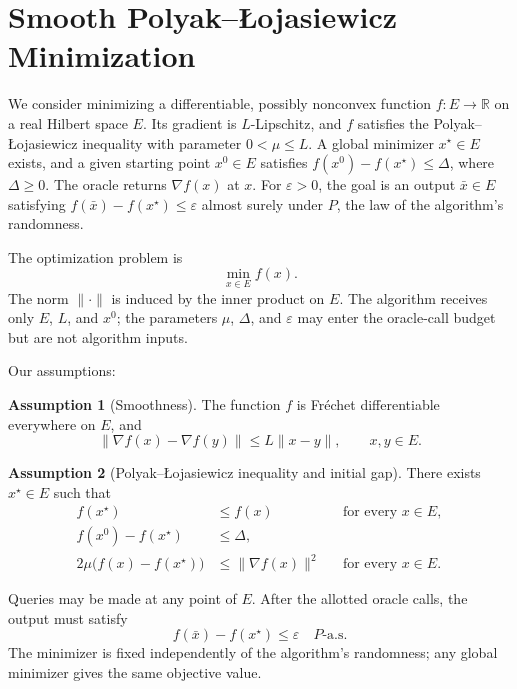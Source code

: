 \documentclass[10pt]{article}
\theoremstyle{definition}
\newtheorem{assumption}{Assumption}
\begin{document}
\section*{Smooth Polyak--\L{}ojasiewicz Minimization}
We consider minimizing a differentiable, possibly nonconvex function $f:E\to\mathbb{R}$ on a real Hilbert space $E$. Its gradient is $L$-Lipschitz, and $f$ satisfies the Polyak--\L{}ojasiewicz inequality with parameter $0<\mu\leq L$. A global minimizer $x^\star\in E$ exists, and a given starting point $x^0\in E$ satisfies $f(x^0)-f(x^\star)\leq\Delta$, where $\Delta\geq0$. The oracle returns $\nabla f(x)$ at $x$. For $\varepsilon>0$, the goal is an output $\bar{x}\in E$ satisfying $f(\bar{x})-f(x^\star)\leq\varepsilon$ almost surely under $P$, the law of the algorithm's randomness.

The optimization problem is
\[
\min_{x\in E} f(x).
\]
The norm $\|\cdot\|$ is induced by the inner product on $E$. The algorithm receives only $E$, $L$, and $x^0$; the parameters $\mu$, $\Delta$, and $\varepsilon$ may enter the oracle-call budget but are not algorithm inputs.

Our assumptions:
\begin{assumption}[Smoothness]
The function $f$ is Fr\'echet differentiable everywhere on $E$, and
\[
\|\nabla f(x)-\nabla f(y)\|\leq L\|x-y\|,
\qquad x,y\in E.
\]
\end{assumption}

\begin{assumption}[Polyak--\L{}ojasiewicz inequality and initial gap]
There exists $x^\star\in E$ such that
\[
\begin{aligned}
f(x^\star)&\leq f(x) &&\text{for every }x\in E,\\
f(x^0)-f(x^\star)&\leq\Delta,\\
2\mu\bigl(f(x)-f(x^\star)\bigr)&\leq\|\nabla f(x)\|^2
&&\text{for every }x\in E.
\end{aligned}
\]
\end{assumption}

Queries may be made at any point of $E$. After the allotted oracle calls, the output must satisfy
\[
f(\bar{x})-f(x^\star)\leq\varepsilon
\quad P\text{-a.s.}
\]
The minimizer is fixed independently of the algorithm's randomness; any global minimizer gives the same objective value.
\end{document}
